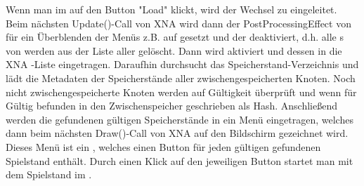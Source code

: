 Wenn man im  auf den Button "Load" klickt, wird der Wechsel zu  eingeleitet.
Beim nächsten Update()-Call von XNA wird dann der PostProcessingEffect von  für ein Überblenden der Menüs z.B. auf  gesetzt und der  deaktiviert, d.h. alle s von  werden aus der Liste aller  gelöscht. Dann wird  aktiviert und dessen  in die XNA -Liste eingetragen.
\newline
Daraufhin durchsucht  das Speicherstand-Verzeichnis und lädt die Metadaten der Speicherstände aller zwischengespeicherten Knoten.
\newline
Noch nicht zwischengespeicherte Knoten werden auf Gültigkeit überprüft und wenn für Gültig befunden in den Zwischenspeicher geschrieben als Hash.
\newline
Anschließend werden die gefundenen gültigen Speicherstände in ein Menü eingetragen, welches dann beim nächsten Draw()-Call von XNA auf den Bildschirm gezeichnet wird.
\newline
Dieses Menü ist ein , welches einen Button für jeden gültigen gefundenen Spielstand enthält. Durch einen Klick auf den jeweiligen Button startet man mit dem Spielstand im .

